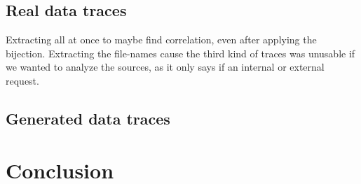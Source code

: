 \documentclass[a4paper]{article}%
\begin{document}
\subsection{Real data traces}
Extracting all at once to maybe find correlation, even after applying the bijection. Extracting the file-names cause the third kind of traces was unusable if we wanted to analyze the sources, as it only says if an internal or external request.

\subsection{Generated data traces}


\section*{Conclusion}

\clearpage
\end{document}
